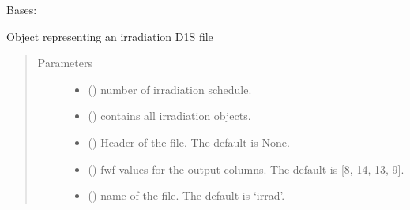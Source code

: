 \documentclass[letterpaper,10pt,english]{sphinxmanual}
\begin{document}
\begin{fulllineitems}
\label{\detokenize{api/inputgeneration:parsersD1S.IrradiationFile}}
Bases: 

Object representing an irradiation D1S file
\begin{quote}\begin{description}
\item[{Parameters}] \leavevmode\begin{itemize}
\item {} 
 () \textendash{} number of irradiation schedule.

\item {} 
 () \textendash{} contains all irradiation objects.

\item {} 
 (\sphinxstyleliteralemphasis{\sphinxupquote{, }}) \textendash{} Header of the file. The default is None.

\item {} 
 (\sphinxstyleliteralemphasis{\sphinxupquote{, }}) \textendash{} fwf values for the output columns. The default is {[}8, 14, 13, 9{]}.

\item {} 
 (\sphinxstyleliteralemphasis{\sphinxupquote{, }}) \textendash{} name of the file. The default is ‘irrad’.

\end{itemize}


\end{description}
\end{quote}
\end{fulllineitems}
\end{document}
